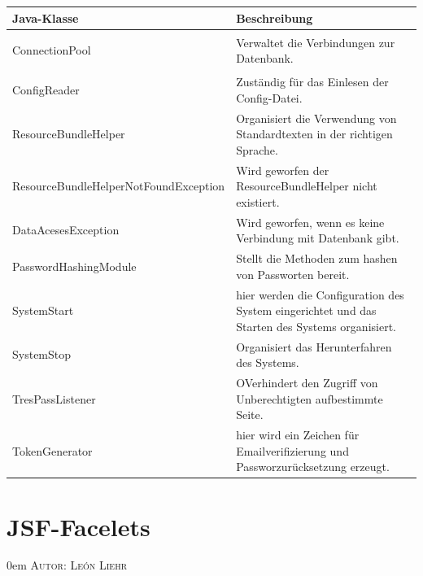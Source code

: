 \documentclass{article}
\makeatletter
\newcommand{\sectionauthor}[1]{
	{\parindent 0em \large \scshape Autor: #1 \par \nobreak \vspace*{1em}}
	\@afterheading
}
\makeatother
\begin{document}
  \begin{center}
    \begin{table}
        \begin{tabular} { |p{}|p{}| }
              \hline
            Java-Klasse & Beschreibung  \\
           \hline\hline
            \hypertarget{ConnectionPool}{ConnectionPool} & Verwaltet die Verbindungen zur Datenbank. \\
            \hline
            ConfigReader& Zuständig  für das Einlesen der Config-Datei. \\
             \hline
            ResourceBundleHelper & Organisiert die Verwendung von Standardtexten in
            der richtigen Sprache.\\

            \hline ResourceBundleHelperNotFoundException & Wird geworfen der ResourceBundleHelper nicht existiert. \\
             \hline
            DataAcesesException & Wird geworfen,  wenn es keine Verbindung mit Datenbank gibt. \\
            \hline
            PasswordHashingModule & Stellt die Methoden zum hashen  von Passworten bereit.\\
            \hline
            SystemStart & hier werden die Configuration des System eingerichtet und das Starten des Systems organisiert.\\
            \hline
            SystemStop & Organisiert das Herunterfahren des Systems.\\
             \hline
            \hypertarget{PhaseListener}{TresPassListener} & OVerhindert den Zugriff von Unberechtigten aufbestimmte Seite.\\
            \hline
            TokenGenerator & hier wird ein Zeichen für Emailverifizierung und Passworzurücksetzung erzeugt.\\
           \hline
        \end{tabular}
        \end{table}
        \end{center}








\section{JSF-Facelets}
\sectionauthor{León Liehr}
\hypertarget{Facelets}{}
\end{document}
